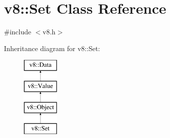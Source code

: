 \hypertarget{classv8_1_1_set}{}\section{v8\+:\+:Set Class Reference}
\label{classv8_1_1_set}


{\ttfamily \#include $<$v8.\+h$>$}

Inheritance diagram for v8\+:\+:Set\+:\begin{figure}[H]
\begin{center}
\leavevmode
\includegraphics[height=4.000000cm]{classv8_1_1_set}
\end{center}
\end{figure}
